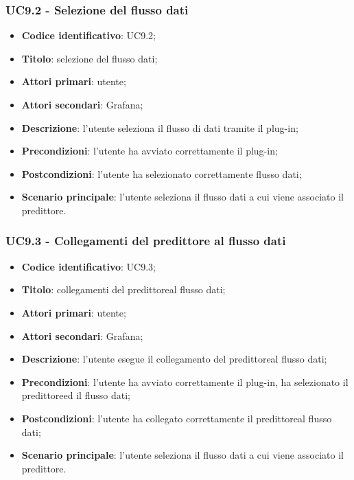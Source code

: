 \subsubsection{UC9.2 - Selezione del flusso dati}
\begin{itemize}
	\item \textbf{Codice identificativo}: UC9.2;
	\item \textbf{Titolo}: selezione del flusso dati;
	\item \textbf{Attori primari}: utente;
	\item \textbf{Attori secondari}: Grafana\glo;
	\item \textbf{Descrizione}: l'utente seleziona il flusso di dati tramite il plug-in;
	\item \textbf{Precondizioni}: l'utente ha avviato correttamente il plug-in;
	\item \textbf{Postcondizioni}: l'utente ha selezionato correttamente flusso dati;
	\item \textbf{Scenario principale}: l'utente seleziona il flusso dati a cui viene associato il predittore\glo.
\end{itemize}

\subsubsection{UC9.3 - Collegamenti del predittore al flusso dati}
\begin{itemize}
	\item \textbf{Codice identificativo}: UC9.3;
	\item \textbf{Titolo}: collegamenti del predittore\glosp al flusso dati;
	\item \textbf{Attori primari}: utente;
	\item \textbf{Attori secondari}: Grafana\glo;
	\item \textbf{Descrizione}: l'utente esegue il collegamento del predittore\glosp al flusso dati;
	\item \textbf{Precondizioni}: l'utente ha avviato correttamente il plug-in, ha selezionato il predittore\glosp ed il flusso dati;
	\item \textbf{Postcondizioni}: l'utente ha collegato correttamente il predittore\glosp al flusso dati;
	\item \textbf{Scenario principale}: l'utente seleziona il flusso dati a cui viene associato il predittore\glo.
\end{itemize}

